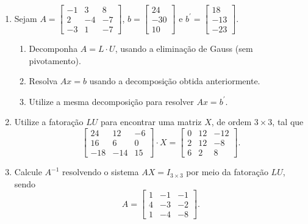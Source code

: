 \documentclass[12pt,a4paper]{article}
\newcommand{\IconCalc}{\texttt{[image: calculator.png]}}
\newlength{\SmileysLength}
\newcommand{\calc}{\hspace*{-\SmileysLength}\makebox[0pt][r]{\IconCalc}%
   \hspace*{\SmileysLength}}
\begin{document}
\begin{enumerate}
\item %
Sejam $A = 
\begin{bmatrix}
-1 &  3 &  8 \\
 2 & -4 & -7 \\
-3 &  1 & -7
\end{bmatrix}$, $b = 
\begin{bmatrix}
 24 \\
-30 \\
 10
\end{bmatrix}$ e $b^\prime = 
\begin{bmatrix}
 18 \\
-13 \\
-23
\end{bmatrix}$.
\begin{enumerate}
\item Decomponha $A = L \cdot U$, usando a eliminação de Gauss (sem pivotamento). 
\item Resolva $Ax = b$ usando a decomposição obtida anteriormente.
\item Utilize a mesma decomposição para resolver $Ax = b^\prime$.
\end{enumerate}

\item %
Utilize a fatoração $LU$ para encontrar uma matriz $X$, de ordem $3 \times 3$, tal que
\[
\begin{bmatrix}
 24 &  12 & -6\\
 16 &   6 &  0\\
-18 & -14 & 15
\end{bmatrix}
\cdot X
=
\begin{bmatrix}
0&12&-12\\
2&12&-8\\
6&2&8
\end{bmatrix}.
\]

\item %
Calcule $A^{-1}$ resolvendo o sistema $A X = I_{3 \times 3}$ por meio da fatoração $LU$, sendo
\[
A =
\begin{bmatrix}
1&-1&-1\\
4&-3&-2\\
1&-4&-8
\end{bmatrix}.
\]


\end{enumerate}
\end{document}
